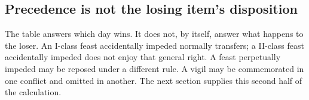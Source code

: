 \subsection{Precedence is not the losing item's disposition}

The table answers which day wins. It does not, by itself, answer what happens to the loser. An I-class feast accidentally impeded normally transfers; a II-class feast accidentally impeded does not enjoy that general right. A feast perpetually impeded may be reposed under a different rule. A vigil may be commemorated in one conflict and omitted in another. The next section supplies this second half of the calculation.
